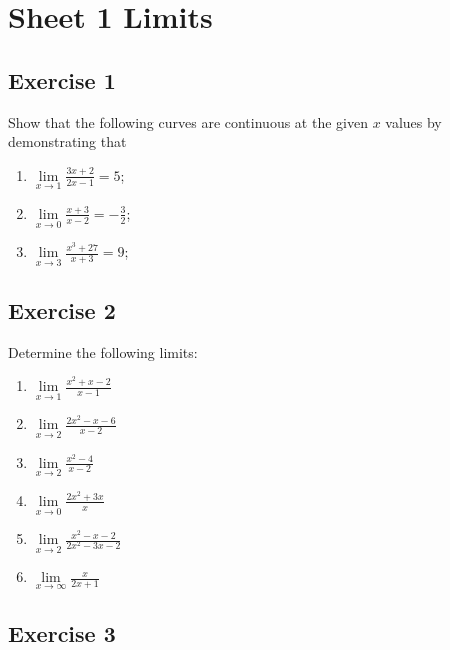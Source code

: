 \documentclass[
  english,
  11pt,
  oneside]{book}
\providecommand{\tightlist}{%
  \setlength{\itemsep}{0pt}\setlength{\parskip}{0pt}}
\newcommand{\slide}{}
\theoremstyle{definition}
\theoremstyle{definition}
\theoremstyle{definition}
\theoremstyle{definition}
\theoremstyle{remark}
\begin{document}
\section{Sheet 1 Limits}\label{sheet-1-limits}

\subsection*{Exercise 1}\label{exercise-1}

Show that the following curves are continuous at the given \(x\) values by demonstrating that

\begin{enumerate}
\def\labelenumi{\alph{enumi}.}
\tightlist
\item
  \(\lim\limits_{x\to1}\frac{3x+2}{2x-1} = 5\);
\item
  \(\lim\limits_{x\to0}\frac{x+3}{x-2} = -\frac 32\);
\item
  \(\lim\limits_{x\to3}\frac{x^3+27}{x+3} = 9\);
\end{enumerate}

\slide

\subsection*{Exercise 2}\label{exercise-2}

Determine the following limits:

\begin{enumerate}
\def\labelenumi{\alph{enumi}.}
\tightlist
\item
  \(\lim\limits_{x\to1}\frac{x^2+x-2}{x-1}\)
\item
  \(\lim\limits_{x\to2}\frac{2x^2-x-6}{x-2}\)
\item
  \(\lim\limits_{x\to2}\frac{x^2-4}{x-2}\)
\item
  \(\lim\limits_{x\to0}\frac{2x^2+3x}{x}\)
\item
  \(\lim\limits_{x\to2}\frac{x^2-x-2}{2x^2-3x-2}\)
\item
  \(\lim\limits_{x\to\infty}\frac{x}{2x+1}\)
\end{enumerate}

\slide

\subsection*{Exercise 3}\label{exercise-3}
\end{document}
